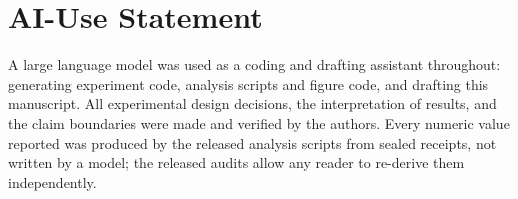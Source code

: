 \documentclass[10pt,twocolumn]{article}
\begin{document}
\section*{AI-Use Statement}

A large language model was used as a coding and drafting assistant throughout:
generating experiment code, analysis scripts and figure code, and drafting this
manuscript. All experimental design decisions, the interpretation of results,
and the claim boundaries were made and verified by the authors. Every numeric
value reported was produced by the released analysis scripts from sealed
receipts, not written by a model; the released audits allow any reader to
re-derive them independently.



\end{document}

